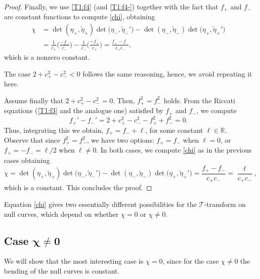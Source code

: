 \documentclass[10pt,a4paper]{amsart}
\numberwithin{equation}{section}
\def\R{\mathbb{R}}
\begin{document}
\begin{proof}
	Finally, we use \eqref{T1:f4} (and \eqref{T1:f4-}) together with the fact that $f_+$ and $f_-$ are constant functions to compute \eqref{chi}, obtaining
	\begin{align*}
		\chi&{}=\det (\eta_+,\widetilde{\eta}_+)\det \bigl(\eta_-,\widetilde{\eta}_-'\bigr)-\det (\eta_-,\widetilde{\eta}_-)\det \bigl(\eta_+,\widetilde{\eta}_+'\bigr)\\
		&{}=\frac{1}{c_+}\biggl(\frac{-f_-}{c_-}\biggr)-\frac{1}{c_-}\biggl(\frac{-f_+}{c_+}\biggr)=\frac{f_+-f_-}{c_+c_-},
	\end{align*}
	which is a nonzero constant.
	
	The case $2+c_+^2-c_-^2<0$ follows the same reasoning, hence, we avoid repeating it here.
	
	Assume finally that $2+c_+^2-c_-^2=0$. Then, $f_+^2=f_-^2$ holds. From the Riccati equations (\eqref{T1:f3} and the analogue one) satisfied by $f_+$ and $f_-$, we compute
	\begin{equation*}f_+'-f_-'=2+c_+^2-c_-^2-f_+^2+f_-^2=0.\end{equation*}
	Thus, integrating this we obtain, $f_+=f_-+\ell$, for some constant $\ell\in\R$. Observe that since $f_+^2=f_-^2$, we have two options: $f_+=f_-$ when $\ell=0$, or $f_+=-f_-=\ell/2$ when $\ell\neq 0$. In both cases, we compute \eqref{chi} as in the previous cases obtaining
	\begin{equation*}\chi=\det (\eta_+,\widetilde{\eta}_+)\det \bigl(\eta_-,\widetilde{\eta}_-'\bigr)-\det (\eta_-,\widetilde{\eta}_-)\det \bigl(\eta_+,\widetilde{\eta}_+'\bigr)=\frac{f_+-f_-}{c_+c_-}=\frac{\ell}{c_+c_-},\end{equation*}
	which is a constant. This concludes the proof.
\end{proof}

Equation \eqref{chi} gives two essentially different possibilities for the $\mathcal{T}$-transform on null curves, which depend on whether $\chi=0$ or $\chi\neq 0$.

\subsection[Case chi neq 0]{Case $\boldsymbol{\chi\neq 0}$}

We will show that the most interesting case is $\chi=0$, since for the case $\chi\neq 0$ the bending of the null curves is constant.
\end{document}
